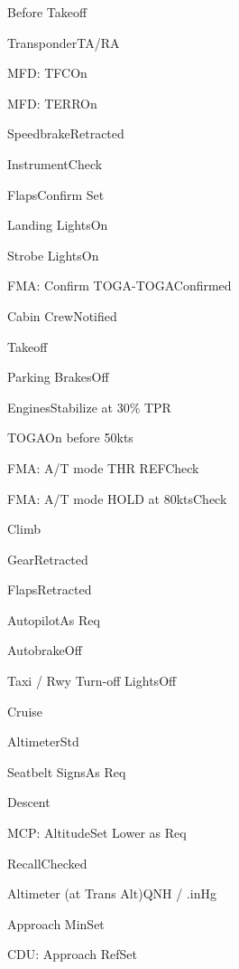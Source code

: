 \documentclass[sim-use]{checklist}
\begin{document}
\begin{checklist}{Before Takeoff}
  \item{Transponder}{TA/RA}
  \item{MFD: TFC}{On}
  \item{MFD: TERR}{On}
  \item{Speedbrake}{Retracted}
  \item{Instrument}{Check}
  \item{Flaps}{Confirm Set}
  \item{Landing Lights}{On}
  \item{Strobe Lights}{On}
  \item{FMA: Confirm TOGA-TOGA}{Confirmed}
  \item{Cabin Crew}{Notified}
\end{checklist}

\begin{checklist}{Takeoff}
  \item{Parking Brakes}{Off}
  \item{Engines}{Stabilize at 30\% TPR}
  \item{TOGA}{On before 50kts}
  \item{FMA: A/T mode THR REF}{Check}
  \item{FMA: A/T mode HOLD at 80kts}{Check}
\end{checklist}

\begin{checklist}{Climb}
  \item{Gear}{Retracted}
  \item{Flaps}{Retracted}
  \item{Autopilot}{As Req}
  \item{Autobrake}{Off}
  \item{Taxi / Rwy Turn-off Lights}{Off}
\end{checklist}

\begin{checklist}{Cruise}
  \item{Altimeter}{Std}
  \item{Seatbelt Signs}{As Req}
\end{checklist}

\begin{checklist}{Descent}
  \item{MCP: Altitude}{Set Lower as Req}
  \item{Recall}{Checked}
  \item{Altimeter (at Trans Alt)}{\blank QNH / \blank.\blank inHg}
  \item{Approach Min}{Set}
  \item{CDU: Approach Ref}{Set}
\end{checklist}
\end{document}
